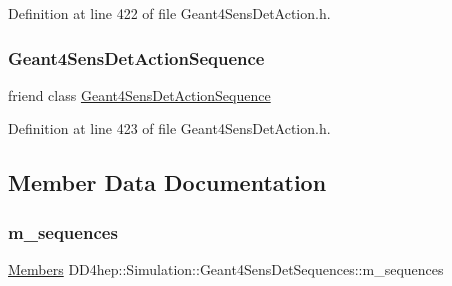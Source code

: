 Definition at line 422 of file Geant4\+Sens\+Det\+Action.\+h.

\hypertarget{class_d_d4hep_1_1_simulation_1_1_geant4_sens_det_sequences_a0dd78d992a2c8dccba1ab80d814020cc}{}\label{class_d_d4hep_1_1_simulation_1_1_geant4_sens_det_sequences_a0dd78d992a2c8dccba1ab80d814020cc} 
\subsubsection{\texorpdfstring{Geant4\+Sens\+Det\+Action\+Sequence}{Geant4SensDetActionSequence}}
{\footnotesize\ttfamily friend class \hyperlink{class_d_d4hep_1_1_simulation_1_1_geant4_sens_det_action_sequence}{Geant4\+Sens\+Det\+Action\+Sequence}\hspace{0.3cm}{\ttfamily [friend]}}



Definition at line 423 of file Geant4\+Sens\+Det\+Action.\+h.



\subsection{Member Data Documentation}
\hypertarget{class_d_d4hep_1_1_simulation_1_1_geant4_sens_det_sequences_a913b05e77e69effeeafbd0f7a604cd70}{}\label{class_d_d4hep_1_1_simulation_1_1_geant4_sens_det_sequences_a913b05e77e69effeeafbd0f7a604cd70} 
\subsubsection{\texorpdfstring{m\+\_\+sequences}{m\_sequences}}
{\footnotesize\ttfamily \hyperlink{class_d_d4hep_1_1_simulation_1_1_geant4_sens_det_sequences_a2266138a517dd9b784af9234312fdd12}{Members} D\+D4hep\+::\+Simulation\+::\+Geant4\+Sens\+Det\+Sequences\+::m\+\_\+sequences\hspace{0.3cm}{\ttfamily [private]}}



